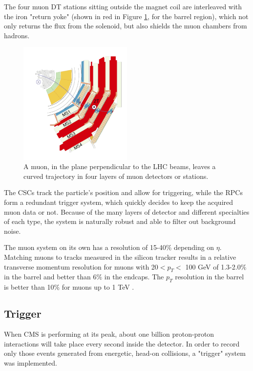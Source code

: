 The four muon DT stations sitting outside the magnet coil are interleaved with the
iron "return yoke" (shown in red in Figure \ref{fig:cmsmuchambers}, for the barrel region), which not only returns the flux from the solenoid, but also shields the muon chambers from hadrons. 

    \begin{figure}[h]
 	\centering
 	\includegraphics[width=0.5\textwidth]{figures/MuStations.png}
 	\singlespace
 	\caption{A muon, in the plane perpendicular to the LHC beams, leaves a curved trajectory in four layers of muon detectors or stations.}
 	\label{fig:cmsmuchambers}
	\end{figure}

The CSCs track the particle's position and allow for triggering, while the RPCs form a redundant trigger system, which quickly decides to keep the acquired muon data or not. Because of the many layers of detector and different specialties of each type, the system is naturally robust and able to filter out background noise.

The muon system on its own has a resolution of 15-40$\%$ depending on $\eta$. Matching muons to tracks measured in the silicon tracker results in a relative transverse momentum resolution for muons with 20$< p_{T} < $ 100 GeV of 1.3-2.0$\%$ in the barrel and better than 6$\%$ in the endcaps. The $p_{T}$ resolution in the barrel is better than 10$\%$ for muons up to 1 TeV \cite{Chatrchyan:2012xi}.


 \subsection{Trigger}
 When CMS is performing at its peak, about one billion proton-proton interactions will take place every second inside the detector. In order to record only those events generated from energetic, head-on collisions, a "trigger" system was implemented.

